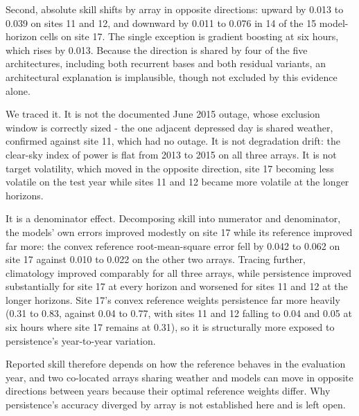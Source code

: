 Second, absolute skill shifts by array in opposite directions: upward by
0.013 to 0.039 on sites 11 and 12, and downward by 0.011 to 0.076 in 14
of the 15 model-horizon cells on site 17. The single exception is
gradient boosting at six hours, which rises by 0.013. Because the
direction is shared by four of the five architectures, including both
recurrent bases and both residual variants, an architectural explanation
is implausible, though not excluded by this evidence alone.

We traced it. It is not the documented June 2015 outage, whose exclusion
window is correctly sized - the one adjacent depressed day is shared
weather, confirmed against site 11, which had no outage. It is not
degradation drift: the clear-sky index of power is flat from 2013 to
2015 on all three arrays. It is not target volatility, which moved in
the opposite direction, site 17 becoming less volatile on the test year
while sites 11 and 12 became more volatile at the longer horizons.

It is a denominator effect. Decomposing skill into numerator and
denominator, the models' own errors improved modestly on site 17 while
its reference improved far more: the convex reference root-mean-square
error fell by 0.042 to 0.062 on site 17 against 0.010 to 0.022 on the
other two arrays. Tracing further, climatology improved comparably for
all three arrays, while persistence improved substantially for site 17
at every horizon and worsened for sites 11 and 12 at the longer
horizons. Site 17's convex reference weights persistence far more
heavily (0.31 to 0.83, against 0.04 to 0.77, with sites 11 and 12
falling to 0.04 and 0.05 at six hours where site 17 remains at 0.31), so it is structurally more
exposed to persistence's year-to-year variation.

Reported skill therefore depends on how the reference behaves in the
evaluation year, and two co-located arrays sharing weather and models
can move in opposite directions between years because their optimal
reference weights differ. Why persistence's accuracy diverged by array
is not established here and is left open.
